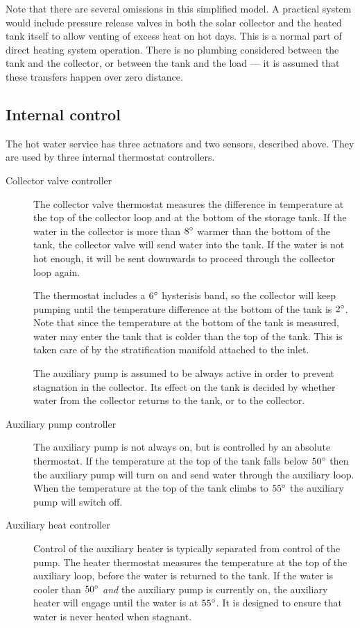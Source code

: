 Note that there are several omissions in this simplified model.
A practical system would include pressure release valves in both the solar collector and the heated tank itself to allow venting of excess heat on hot days.
This is a normal part of direct heating system operation.
There is no plumbing considered between the tank and the collector, or between the tank and the load --- it is assumed that these transfers happen over zero distance.

\subsection{Internal control}
\label{sec:model:system:control}

The hot water service has three actuators and two sensors, described above.
They are used by three internal thermostat controllers.

\begin{description}
   \item[Collector valve controller]
      The collector valve thermostat measures the difference in temperature at the top of the collector loop and at the bottom of the storage tank.
      If the water in the collector is more than $8^{\circ}$ warmer than the bottom of the tank, the collector valve will send water into the tank.
      If the water is not hot enough, it will be sent downwards to proceed through the collector loop again.

      The thermostat includes a $6^{\circ}$ hysterisis band, so the collector will keep pumping until the temperature difference at the bottom of the tank is $2^{\circ}$.
      Note that since the temperature at the bottom of the tank is measured, water may enter the tank that is colder than the top of the tank.
      This is taken care of by the stratification manifold attached to the inlet.

      The auxiliary pump is assumed to be always active in order to prevent stagnation in the collector.
      Its effect on the tank is decided by whether water from the collector returns to the tank, or to the collector.

   \item[Auxiliary pump controller]
      The auxiliary pump is not always on, but is controlled by an absolute thermostat.
      If the temperature at the top of the tank falls below $50^{\circ}$ then the auxiliary pump will turn on and send water through the auxiliary loop.
      When the temperature at the top of the tank climbs to $55^{\circ}$ the auxiliary pump will switch off.

   \item[Auxiliary heat controller]
      Control of the auxiliary heater is typically separated from control of the pump.
      The heater thermostat measures the temperature at the top of the auxiliary loop, before the water is returned to the tank.
      If the water is cooler than $50^{\circ}$ \emph{and} the auxiliary pump is currently on, the auxiliary heater will engage until the water is at $55^{\circ}$.
      It is designed to ensure that water is never heated when stagnant.
\end{description}

